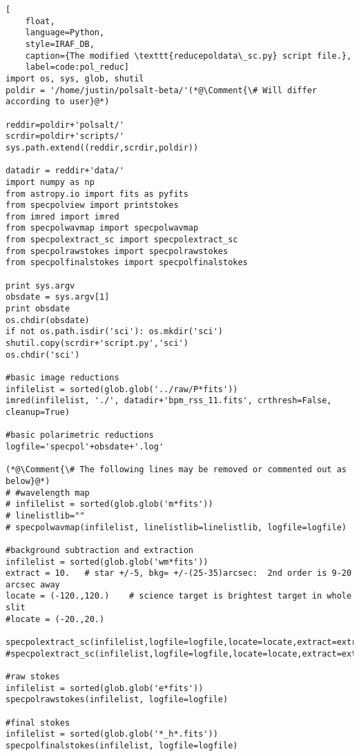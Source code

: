 \newcommand*{\Comment}[1]{\hfill\makebox[7.0cm][l]{#1}}%
\begin{lstlisting}[
    float,
    language=Python,
    style=IRAF_DB,
    caption={The modified \texttt{reducepoldata\_sc.py} script file.},
    label=code:pol_reduc]
import os, sys, glob, shutil
poldir = '/home/justin/polsalt-beta/'(*@\Comment{\# Will differ according to user}@*)

reddir=poldir+'polsalt/'
scrdir=poldir+'scripts/'
sys.path.extend((reddir,scrdir,poldir))

datadir = reddir+'data/'
import numpy as np
from astropy.io import fits as pyfits
from specpolview import printstokes
from imred import imred
from specpolwavmap import specpolwavmap
from specpolextract_sc import specpolextract_sc
from specpolrawstokes import specpolrawstokes
from specpolfinalstokes import specpolfinalstokes

print sys.argv
obsdate = sys.argv[1]
print obsdate
os.chdir(obsdate)
if not os.path.isdir('sci'): os.mkdir('sci')
shutil.copy(scrdir+'script.py','sci')
os.chdir('sci')

#basic image reductions
infilelist = sorted(glob.glob('../raw/P*fits'))
imred(infilelist, './', datadir+'bpm_rss_11.fits', crthresh=False, cleanup=True)

#basic polarimetric reductions
logfile='specpol'+obsdate+'.log'

(*@\Comment{\# The following lines may be removed or commented out as below}@*)
# #wavelength map
# infilelist = sorted(glob.glob('m*fits'))
# linelistlib=""
# specpolwavmap(infilelist, linelistlib=linelistlib, logfile=logfile)

#background subtraction and extraction
infilelist = sorted(glob.glob('wm*fits'))
extract = 10.   # star +/-5, bkg= +/-(25-35)arcsec:  2nd order is 9-20 arcsec away
locate = (-120.,120.)    # science target is brightest target in whole slit
#locate = (-20.,20.)

specpolextract_sc(infilelist,logfile=logfile,locate=locate,extract=extract)
#specpolextract_sc(infilelist,logfile=logfile,locate=locate,extract=extract,docomp=True,useoldc=True)

#raw stokes
infilelist = sorted(glob.glob('e*fits'))
specpolrawstokes(infilelist, logfile=logfile)

#final stokes
infilelist = sorted(glob.glob('*_h*.fits'))
specpolfinalstokes(infilelist, logfile=logfile)

\end{lstlisting}

